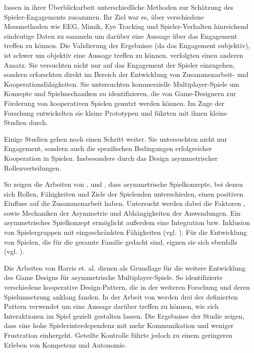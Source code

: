 \cite{rashed_review_2025} fassen in ihrer Überblickarbeit unterschiedliche Methoden zur Schätzung des Spieler-Engagements zusammen. Ihr Ziel war es, über verschiedene Messmethoden wie EEG, Mimik, Eye Tracking und Spieler-Verhalten hinreichend eindeutige Daten zu sammeln um darüber eine Aussage über das Engagement treffen zu können. Die Validierung der Ergebnisse (da das Engagement subjektiv), ist schwer um objektiv eine  Aussage treffen zu können. \cite{yu_video_2023} verfolgten einen anderen Ansatz. Sie versuchten nicht nur auf das Engagement der Spieler einzugehen, sondern erforschten direkt im Bereich der Entwicklung von Zusammenarbeit- und Kooperationsfähigkeiten. Sie untersuchten kommerzielle Multiplayer-Spiele um Konzepte und Spielmechaniken zu identifizieren, die von Game-Designern zur Förderung von kooperativen Spielen genutzt werden können. Im Zuge der Forschung entwickelten sie kleine Prototypen und führten mit ihnen kleine Studien durch. 

Einige Studien gehen noch einen Schritt weiter. Sie untersuchten nicht nur Engagement, sondern auch die spezifischen Bedingungen erfolgreicher Kooperation in Spielen. Insbesondere durch das Design asymmetrischer Rollenverteilungen.

So zeigen die Arbeiten von \cite{harris_beam_2014}, \cite{harris_leveraging_2016} und \cite{harris_asymmetry_2019}, dass asymmetrische Spielkonzepte, bei denen sich Rollen, Fähigkeiten und Ziele der Spielenden unterschieden, einen positiven Einfluss auf die Zusammenarbeit haben. Untersucht werden dabei die Faktoren ,  sowie Mechaniken der Asymmetrie und Abhängigkeiten der Anwendungen. Ein asymmetrisches Spielkonzept ermöglicht außerdem eine Integration bzw. Inklusion von Spielergruppen mit eingeschränkten Fähigkeiten (vgl. \citealp{goncalves_exploring_2021}). Für die Entwicklung von Spielen, die für die gesamte Familie gedacht sind, eignen sie sich ebenfalls (vgl. \citealp{pais_promoting_2024}).

Die Arbeiten von Harris et. al. dienen als Grundlage für die weitere Entwicklung des Game Designs für asymmetrische Multiplayer-Spiele. So identifizierte \cite{guimaraes_rocha_game_2008} verschiedene kooperative Design-Pattern, die in der weiteren Forschung und deren Spielumsetzung anklang fanden. In der Arbeit von \cite{emmerich_impact_2017} werden drei der definierten Pattern verwendet um eine Aussage darüber treffen zu können, wie sich Interaktionen im Spiel gezielt gestalten lassen. Die Ergebnisse der Studie zeigen, dass eine hohe Spielerinterdependenz mit mehr Kommunikation und weniger Frustration einhergeht. Geteilte Kontrolle führte jedoch zu einem geringeren Erleben von Kompetenz und Autonomie.

